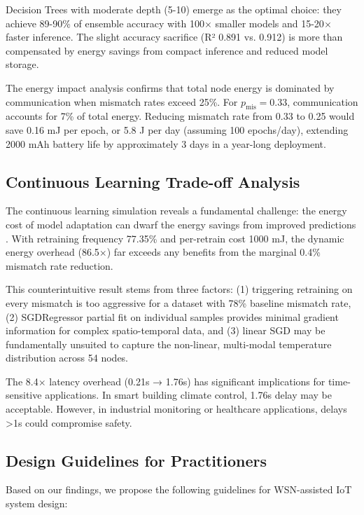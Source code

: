 \documentclass[12pt,a4paper]{article}
\begin{document}
Decision Trees with moderate depth (5-10) emerge as the optimal choice: they achieve 89-90\% of ensemble accuracy with 100$\times$ smaller models and 15-20$\times$ faster inference. The slight accuracy sacrifice (R² 0.891 vs. 0.912) is more than compensated by energy savings from compact inference and reduced model storage.

The energy impact analysis confirms that total node energy is dominated by communication when mismatch rates exceed 25\%. For $p_{\text{mis}} = 0.33$, communication accounts for 7\% of total energy. Reducing mismatch rate from 0.33 to 0.25 would save 0.16 mJ per epoch, or 5.8 J per day (assuming 100 epochs/day), extending 2000 mAh battery life by approximately 3 days in a year-long deployment.

\subsection{Continuous Learning Trade-off Analysis}

The continuous learning simulation reveals a fundamental challenge: the energy cost of model adaptation can dwarf the energy savings from improved predictions \cite{Alonso2024OnlineLearning, Silva2023IncrementalML}. With retraining frequency 77.35\% and per-retrain cost 1000 mJ, the dynamic energy overhead (86.5$\times$) far exceeds any benefits from the marginal 0.4\% mismatch rate reduction.

This counterintuitive result stems from three factors: (1) triggering retraining on every mismatch is too aggressive for a dataset with 78\% baseline mismatch rate, (2) SGDRegressor partial fit on individual samples provides minimal gradient information for complex spatio-temporal data, and (3) linear SGD may be fundamentally unsuited to capture the non-linear, multi-modal temperature distribution across 54 nodes.

The 8.4$\times$ latency overhead (0.21s → 1.76s) has significant implications for time-sensitive applications. In smart building climate control, 1.76s delay may be acceptable. However, in industrial monitoring or healthcare applications, delays >1s could compromise safety.

\subsection{Design Guidelines for Practitioners}

Based on our findings, we propose the following guidelines for WSN-assisted IoT system design:
\end{document}
